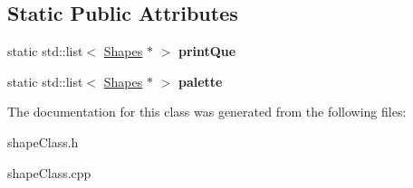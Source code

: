 \subsection*{Static Public Attributes}
\begin{DoxyCompactItemize}
\item 
static std\+::list$<$ \hyperlink{classShapes}{Shapes} $\ast$ $>$ {\bfseries print\+Que}\hypertarget{classShapes_a1a217886fe30f0e2990aefc10c98b12d}{}\label{classShapes_a1a217886fe30f0e2990aefc10c98b12d}

\item 
static std\+::list$<$ \hyperlink{classShapes}{Shapes} $\ast$ $>$ {\bfseries palette}\hypertarget{classShapes_a2a9db6574c30eb12148e007a04207928}{}\label{classShapes_a2a9db6574c30eb12148e007a04207928}

\end{DoxyCompactItemize}


The documentation for this class was generated from the following files\+:\begin{DoxyCompactItemize}
\item 
shape\+Class.\+h\item 
shape\+Class.\+cpp\end{DoxyCompactItemize}
